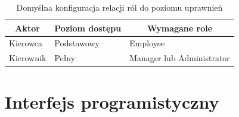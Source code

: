 \documentclass[eng,printmode,openany]{mgr}
\begin{document}
\begin{table}[H]
	\caption{Domyślna konfiguracja relacji ról do poziomu uprawnień}
	\begin{tabularx}{\textwidth}{|l|l|X|}
		\hline
		\multicolumn{1}{|c|}{\textbf{Aktor}} & \multicolumn{1}{c|}{\textbf{Poziom dostępu}} & \multicolumn{1}{c|}{\textbf{Wymagane role}} \\ \hline
		Kierowca                             & Podstawowy                                   & Employee                                    \\ \hline
		Kierownik                            & Pełny                                        & Manager lub Administrator                   \\ \hline
	\end{tabularx}
\end{table}

\newpage
\section{Interfejs programistyczny}
\end{document}
